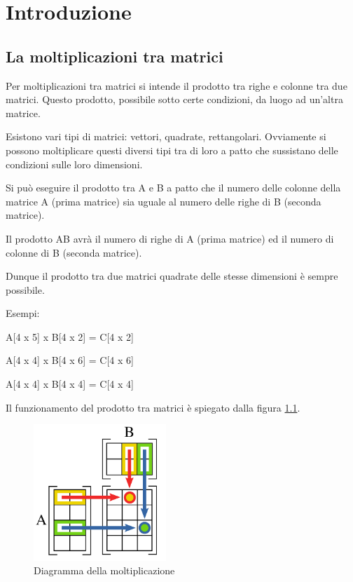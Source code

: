 \chapter{Introduzione}
\section{La moltiplicazioni tra matrici}
Per moltiplicazioni tra matrici si intende il prodotto tra righe e colonne tra due matrici. Questo prodotto, possibile sotto certe condizioni, da luogo ad un'altra matrice.

Esistono vari tipi di matrici: vettori, quadrate, rettangolari. Ovviamente si possono moltiplicare questi diversi tipi tra di loro a patto che sussistano delle condizioni sulle loro dimensioni.

Si pu\`{o} eseguire il prodotto tra A e B a patto che il numero delle colonne della matrice A (prima matrice) sia uguale al numero delle righe  di B (seconda matrice).

Il prodotto AB avr\`{a} il numero di righe di A (prima matrice) ed il numero di colonne di B (seconda matrice).

Dunque il prodotto tra due matrici quadrate delle stesse dimensioni \`{e} sempre possibile.

Esempi:

A[4 x 5] x B[4 x 2] = C[4 x 2]

A[4 x 4] x B[4 x 6] = C[4 x 6]

A[4 x 4] x B[4 x 4] = C[4 x 4]

Il funzionamento del prodotto tra matrici \`{e} spiegato dalla figura \ref{fig:diagram}.

\begin{figure}[htbp]
    \begin{center}
        \includegraphics[width=5cm]{immagini/matrix_multiplication_diagram.png}
    \end{center}
    \caption{Diagramma della moltiplicazione}
    \label{fig:diagram}
\end{figure}

